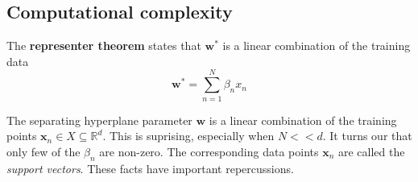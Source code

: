 \documentclass[titlepage, 12pt, leqno]{article}
\begin{document}
\subsection{Computational complexity}
\begin{definition}
    The \textbf{representer theorem} states that $\textbf{w}^{*}$ is a
    linear combination of the training data
    \[
    \textbf{w}^{*} = \sum_{n=1}^{N}\beta_{n}x_{n}
    \]
\end{definition}
The separating hyperplane parameter $\textbf{w}$ is a linear combination of the
training points $\textbf{x}_{n} \in X \subseteq \mathbb{R}^{d}$. This is
suprising, especially when $N << d$. It turns our that only few of the 
$\beta_{n}$ are non-zero. The corresponding data points $\textbf{x}_{n}$ are
called the \textit{support vectors}. These facts have important repercussions.
\end{document}
